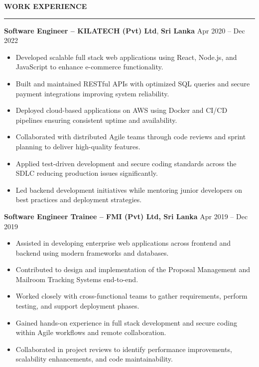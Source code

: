 \documentclass[10pt,letterpaper]{article}
\begin{document}
\textbf{WORK EXPERIENCE}\\[-8pt]
\noindent\rule{\textwidth}{1pt}

\vspace{-2pt}

\textbf{Software Engineer -- KILATECH (Pvt) Ltd}, \textbf{Sri Lanka} \hfill Apr 2020 -- Dec 2022

\vspace{-1pt}

\begin{itemize}
\item Developed scalable full stack web applications using React, Node.js, and JavaScript to enhance e-commerce functionality.
\item Built and maintained RESTful APIs with optimized SQL queries and secure payment integrations improving system reliability.
\item Deployed cloud-based applications on AWS using Docker and CI/CD pipelines ensuring consistent uptime and availability.
\item Collaborated with distributed Agile teams through code reviews and sprint planning to deliver high-quality features.
\item Applied test-driven development and secure coding standards across the SDLC reducing production issues significantly.
\item Led backend development initiatives while mentoring junior developers on best practices and deployment strategies.
\end{itemize}

\textbf{Software Engineer Trainee -- FMI (Pvt) Ltd, Sri Lanka} \hfill Apr 2019 -- Dec 2019

\vspace{-1pt}

\begin{itemize}
\item Assisted in developing enterprise web applications across frontend and backend using modern frameworks and databases.
\item Contributed to design and implementation of the Proposal Management and Mailroom Tracking Systems end-to-end.
\item Worked closely with cross-functional teams to gather requirements, perform testing, and support deployment phases.
\item Gained hands-on experience in full stack development and secure coding within Agile workflows and remote collaboration.
\item Collaborated in project reviews to identify performance improvements, scalability enhancements, and code maintainability.
\end{itemize}
\end{document}
